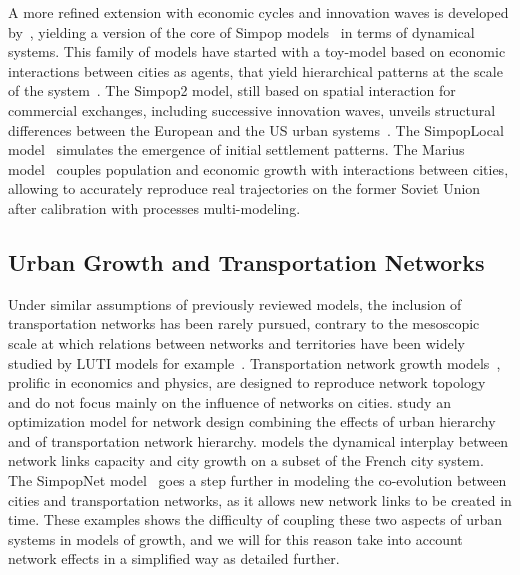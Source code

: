 \documentclass[Royal,sageh,times]{sagej}
\begin{document}
A more refined extension with economic cycles and innovation waves is developed by~\cite{favaro2011gibrat}, yielding a version of the core of Simpop models~\citep{pumain2012multi} in terms of dynamical systems. This family of models have started with a toy-model based on economic interactions between cities as agents, that yield hierarchical patterns at the scale of the system~\citep{sanders1997simpop}. The Simpop2 model, still based on spatial interaction for commercial exchanges, including successive innovation waves, unveils structural differences between the European and the US urban systems~\citep{bretagnolle2010comparer}. The SimpopLocal model~\citep{pumain2017simpoplocal} simulates the emergence of initial settlement patterns. The Marius model~\citep{cottineau2014evolution} couples population and economic growth with interactions between cities, allowing to accurately reproduce real trajectories on the former Soviet Union after calibration with processes multi-modeling.


\subsection*{Urban Growth and Transportation Networks}


Under similar assumptions of previously reviewed models, the inclusion of transportation networks has been rarely pursued, contrary to the mesoscopic scale at which relations between networks and territories have been widely studied by LUTI models for example~\citep{chang2006models}. Transportation network growth models~\citep{xie2009modeling}, prolific in economics and physics, are designed to reproduce network topology and do not focus mainly on the influence of networks on cities. \cite{bigotte2010integrated} study an optimization model for network design combining the effects of urban hierarchy and of transportation network hierarchy. \cite{baptiste1999interactions} models the dynamical interplay between network links capacity and city growth on a subset of the French city system. The SimpopNet model~\citep{schmitt2014modelisation} goes a step further in modeling the co-evolution between cities and transportation networks, as it allows new network links to be created in time. These examples shows the difficulty of coupling these two aspects of urban systems in models of growth, and we will for this reason take into account network effects in a simplified way as detailed further.
\end{document}
